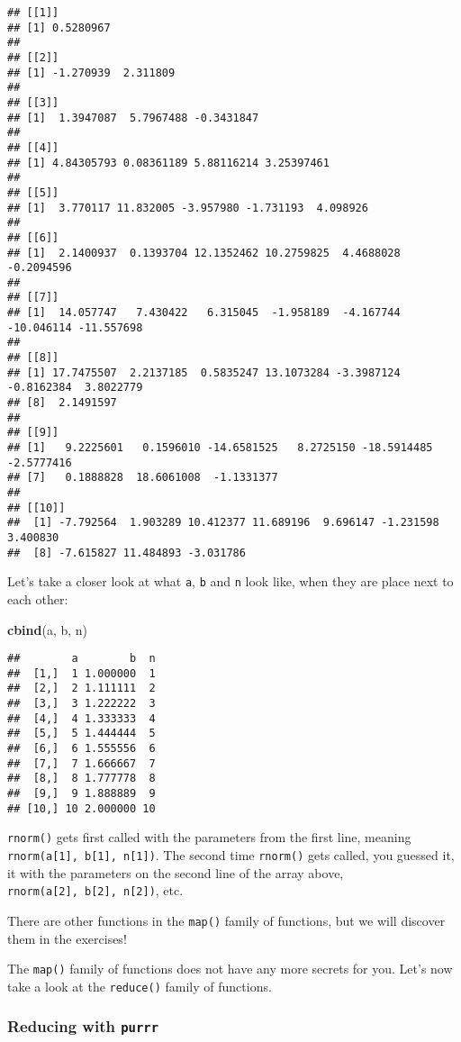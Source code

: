 \documentclass[
]{article}
\newenvironment{Shaded}{\begin{snugshade}}{\end{snugshade}}
\newcommand{\KeywordTok}[1]{\textcolor[rgb]{0.13,0.29,0.53}{\textbf{#1}}}
\newcommand{\NormalTok}[1]{#1}
\begin{document}
\begin{verbatim}
## [[1]]
## [1] 0.5280967
## 
## [[2]]
## [1] -1.270939  2.311809
## 
## [[3]]
## [1]  1.3947087  5.7967488 -0.3431847
## 
## [[4]]
## [1] 4.84305793 0.08361189 5.88116214 3.25397461
## 
## [[5]]
## [1]  3.770117 11.832005 -3.957980 -1.731193  4.098926
## 
## [[6]]
## [1]  2.1400937  0.1393704 12.1352462 10.2759825  4.4688028 -0.2094596
## 
## [[7]]
## [1]  14.057747   7.430422   6.315045  -1.958189  -4.167744 -10.046114 -11.557698
## 
## [[8]]
## [1] 17.7475507  2.2137185  0.5835247 13.1073284 -3.3987124 -0.8162384  3.8022779
## [8]  2.1491597
## 
## [[9]]
## [1]   9.2225601   0.1596010 -14.6581525   8.2725150 -18.5914485  -2.5777416
## [7]   0.1888828  18.6061008  -1.1331377
## 
## [[10]]
##  [1] -7.792564  1.903289 10.412377 11.689196  9.696147 -1.231598  3.400830
##  [8] -7.615827 11.484893 -3.031786
\end{verbatim}

Let's take a closer look at what \texttt{a}, \texttt{b} and \texttt{n} look like, when they are place next to each other:

\begin{Shaded}
\begin{Highlighting}[]
\KeywordTok{cbind}\NormalTok{(a, b, n)}
\end{Highlighting}
\end{Shaded}

\begin{verbatim}
##        a        b  n
##  [1,]  1 1.000000  1
##  [2,]  2 1.111111  2
##  [3,]  3 1.222222  3
##  [4,]  4 1.333333  4
##  [5,]  5 1.444444  5
##  [6,]  6 1.555556  6
##  [7,]  7 1.666667  7
##  [8,]  8 1.777778  8
##  [9,]  9 1.888889  9
## [10,] 10 2.000000 10
\end{verbatim}

\texttt{rnorm()} gets first called with the parameters from the first line, meaning
\texttt{rnorm(a{[}1{]},\ b{[}1{]},\ n{[}1{]})}. The second time \texttt{rnorm()} gets called, you guessed it,
it with the parameters on the second line of the array above,
\texttt{rnorm(a{[}2{]},\ b{[}2{]},\ n{[}2{]})}, etc.

There are other functions in the \texttt{map()} family of functions, but we will discover them in the
exercises!

The \texttt{map()} family of functions does not have any more secrets for you. Let's now take a look at
the \texttt{reduce()} family of functions.

\hypertarget{reducing-with-purrr}{%
\subsubsection{\texorpdfstring{Reducing with \texttt{purrr}}{Reducing with purrr}}\label{reducing-with-purrr}}
\end{document}
